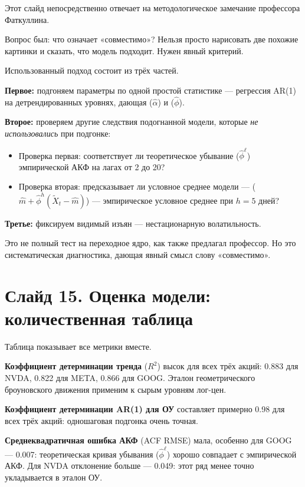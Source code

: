 \documentclass[12pt,a4paper]{article}
\begin{document}
Этот слайд непосредственно отвечает на методологическое замечание профессора Фаткуллина.

Вопрос был: что означает «совместимо»?
Нельзя просто нарисовать две похожие картинки и сказать, что модель подходит.
Нужен явный критерий.

Использованный подход состоит из трёх частей.

\textbf{Первое:} подгоняем параметры по одной простой статистике ---
регрессия AR(1) на детрендированных уровнях,
дающая ($\hat\alpha$) и ($\hat\phi$).

\textbf{Второе:} проверяем другие следствия подогнанной модели,
которые \emph{не использовались} при подгонке:
\begin{itemize}
  \item Проверка первая: соответствует ли теоретическое убывание ($\hat\phi^\ell$)
        эмпирической АКФ на лагах от 2 до 20?
  \item Проверка вторая: предсказывает ли условное среднее модели ---
        ($\hat m + \hat\phi^h(\widetilde{X}_t - \hat m)$) ---
        эмпирическое условное среднее при $h = 5$ дней?
\end{itemize}

\textbf{Третье:} фиксируем видимый изъян ---
нестационарную волатильность.

Это не полный тест на переходное ядро, как также предлагал профессор.
Но это систематическая диагностика, дающая явный смысл
слову «совместимо».

\section{Слайд 15. Оценка модели: количественная таблица}

Таблица показывает все метрики вместе.

\textbf{Коэффициент детерминации тренда} ($R^2$) высок для всех трёх акций:
0.883 для NVDA, 0.822 для META, 0.866 для GOOG.
Эталон геометрического броуновского движения применим к сырым уровням лог-цен.

\textbf{Коэффициент детерминации AR(1) для ОУ} составляет примерно 0.98
для всех трёх акций: одношаговая подгонка очень точная.

\textbf{Среднеквадратичная ошибка АКФ} (ACF RMSE)
мала, особенно для GOOG --- 0.007:
теоретическая кривая убывания ($\hat\phi^\ell$) хорошо совпадает
с эмпирической АКФ.
Для NVDA отклонение больше --- 0.049:
этот ряд менее точно укладывается в эталон ОУ.
\end{document}
